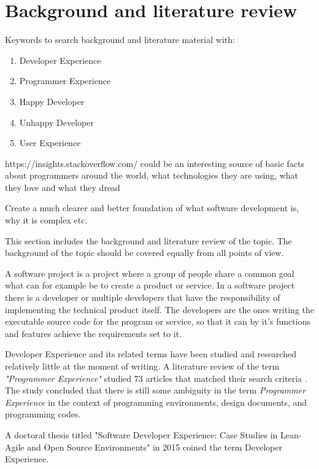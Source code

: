 \documentclass[english, 12pt, a4paper, sci, utf8, a-1b, online]{aaltothesis}
\begin{document}
\clearpage
\section{Background and literature review}
 {
  \color{gray}

  Keywords to search background and literature material with:

  \begin{enumerate}
    \item Developer Experience
    \item Programmer Experience
    \item Happy Developer
    \item Unhappy Developer
    \item User Experience
  \end{enumerate}

  https://insights.stackoverflow.com/ could be an interesting source of basic facts about programmers around the world, what technologies they are using, what they love and what they dread

  Create a much clearer and better foundation of what software development is, why it is complex etc.
 }

This section includes the background and literature review of the topic. The background of the topic should be covered equally from all points of view.

A software project is a project where a group of people share a common goal what can for example be to create a product or service. In a software project there is a developer or multiple developers that have the responsibility of implementing the technical product itself. The developers are the ones writing the executable source code for the program or service, so that it can by it's functions and features achieve the requirements set to it.

Developer Experience and its related terms have been studied and researched relatively little at the moment of writing. A literature review of the term \textit{"Programmer Experience"} studied 73 articles that matched their search criteria \cite{programmer-experience}. The study concluded that there is still some ambiguity in the term \textit{Programmer Experience} in the context of programming environments, design documents, and programming codes.

A doctoral thesis titled "Software Developer Experience:
Case Studies in Lean-Agile and Open Source Environments" in 2015 coined the term Developer Experience.
\end{document}
